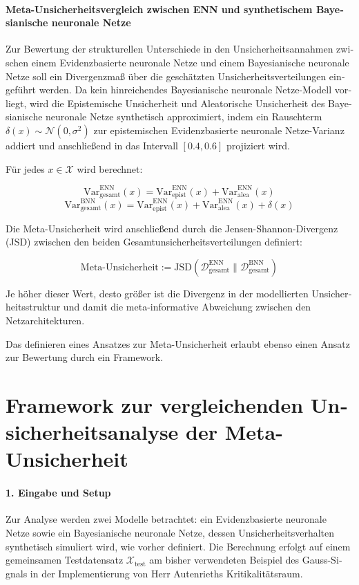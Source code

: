 \begin{otherlanguage}{ngerman}
\paragraph{Meta-Unsicherheitsvergleich zwischen ENN und synthetischem \gls{Bayesianische neuronale Netze}} Zur Bewertung der strukturellen Unterschiede in den Unsicherheitsannahmen zwischen einem \gls{Evidenzbasierte neuronale Netze} und einem \gls{Bayesianische neuronale Netze} soll ein Divergenzmaß über die geschätzten Unsicherheitsverteilungen eingeführt werden. Da kein hinreichendes \gls{Bayesianische neuronale Netze}-Modell vorliegt, wird die \gls{Epistemische Unsicherheit} und \gls{Aleatorische Unsicherheit} des \gls{Bayesianische neuronale Netze} synthetisch approximiert, indem ein Rauschterm \( \delta(x) \sim \mathcal{N}(0, \sigma^2) \) zur epistemischen \gls{Evidenzbasierte neuronale Netze}-Varianz addiert und anschließend in das Intervall \([0.4, 0.6]\) projiziert wird.

Für jedes \( x \in \mathcal{X} \) wird berechnet:

\[
\text{Var}_{\text{gesamt}}^{\text{ENN}}(x) = \text{Var}_{\text{epist}}^{\text{ENN}}(x) + \text{Var}_{\text{alea}}^{\text{ENN}}(x)
\]
\[
\text{Var}_{\text{gesamt}}^{\text{BNN}}(x) = \text{Var}_{\text{epist}}^{\text{ENN}}(x) + \text{Var}_{\text{alea}}^{\text{ENN}}(x) + \delta(x) 
\]

Die Meta-Unsicherheit wird anschließend durch die Jensen-Shannon-Divergenz (JSD) zwischen den beiden Gesamtunsicherheitsverteilungen definiert:

\[
\text{Meta-Unsicherheit} := \text{JSD}\left( \mathcal{D}_{\text{gesamt}}^{\text{ENN}} \parallel \mathcal{D}_{\text{gesamt}}^{\text{BNN}} \right)
\]

Je höher dieser Wert, desto größer ist die Divergenz in der modellierten Unsicherheitsstruktur und damit die meta-informative Abweichung zwischen den Netzarchitekturen. 

Das definieren eines Ansatzes zur Meta-Unsicherheit erlaubt ebenso einen Ansatz zur Bewertung durch ein Framework. 

\section*{Framework zur vergleichenden Unsicherheitsanalyse der Meta-Unsicherheit}

\paragraph{1. Eingabe und Setup} Zur Analyse werden zwei Modelle betrachtet: ein \gls{Evidenzbasierte neuronale Netze} sowie ein \gls{Bayesianische neuronale Netze}, dessen Unsicherheitsverhalten synthetisch simuliert wird, wie vorher definiert. Die Berechnung erfolgt auf einem gemeinsamen Testdatensatz \( \mathcal{X}_{\text{test}} \) am bisher verwendeten Beispiel des Gauss-Signals in der Implementierung von Herr Autenrieths Kritikalitätsraum.


\end{otherlanguage}
